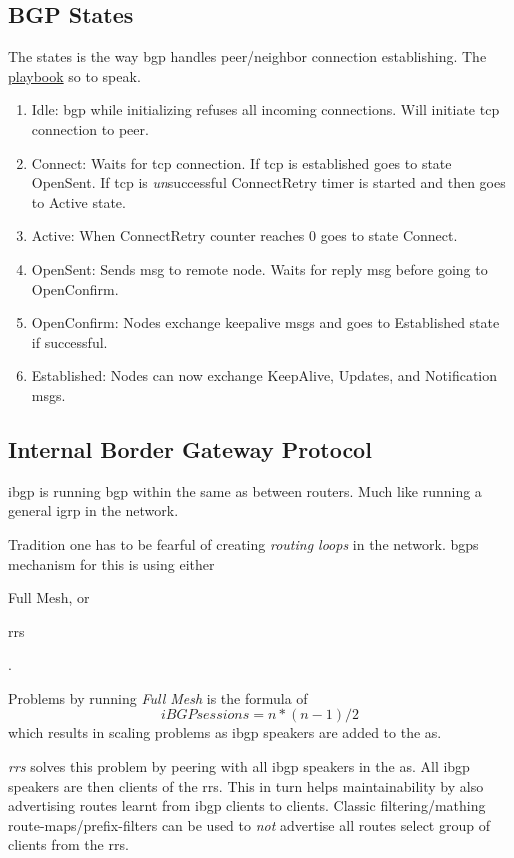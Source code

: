\subsection[States]{BGP States}

The states is the way \gls{bgp} handles peer/neighbor connection establishing. The \underline{playbook} so to speak.

\begin{enumerate}
    \item Idle: \gls{bgp} while initializing refuses all incoming connections. Will initiate \gls{tcp} connection to peer.
    \item Connect: Waits for \gls{tcp} connection. If \gls{tcp} is established goes to state OpenSent. If \gls{tcp} is \textit{un}successful ConnectRetry timer is started and then goes to Active state.
    \item Active: When ConnectRetry counter reaches 0 goes to state Connect.
    \item OpenSent: Sends \gls{msg} to remote node. Waits for reply \gls{msg} before going to OpenConfirm.
    \item OpenConfirm: Nodes exchange keepalive \glspl{msg} and goes to Established state if successful.
    \item Established: Nodes can now exchange KeepAlive, Updates, and Notification \glspl{msg}.
\end{enumerate}

\subsection[iBGP]{Internal Border Gateway Protocol}

\gls{ibgp} is running \gls{bgp} within the same \gls{as} between routers. Much like running a general \gls{igrp} in the network.

Tradition one has to be fearful of creating \textit{routing loops} in the network. \glspl{bgp} mechanism for this is using either \begin{mylist} \item Full Mesh, or \item \glspl{rr} \end{mylist}.

Problems by running \textit{Full Mesh} is the formula of \[ iBGPsessions = n*(n-1)/2 \]  which results in scaling problems as \gls{ibgp} speakers are added to the \gls{as}.

\textit{\glspl{rr}} solves this problem by peering with all \gls{ibgp} speakers in the \gls{as}. All \gls{ibgp} speakers are then clients of the \glspl{rr}. This in turn helps maintainability by also advertising routes learnt from \gls{ibgp} clients to clients. Classic filtering/mathing route-maps/prefix-filters can be used to \textit{not} advertise all routes select group of clients from the \glspl{rr}.

